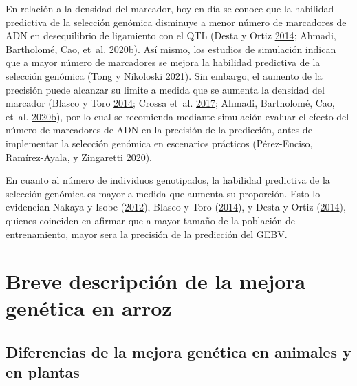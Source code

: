 \documentclass[11pt,spanish,a4paper,oneside,]{book} %
\begin{document}
En relación a la densidad del marcador, hoy en día se conoce que la habilidad predictiva de la selección genómica disminuye a menor número de marcadores de ADN en desequilibrio de ligamiento con el QTL (Desta y Ortiz \protect\hyperlink{ref-cite:10}{2014}; Ahmadi, Bartholomé, Cao, et~al. \protect\hyperlink{ref-cite:45}{2020}\protect\hyperlink{ref-cite:45}{b}). Así mismo, los estudios de simulación indican que a mayor número de marcadores se mejora la habilidad predictiva de la selección genómica (Tong y Nikoloski \protect\hyperlink{ref-cite:7}{2021}). Sin embargo, el aumento de la precisión puede alcanzar su limite a medida que se aumenta la densidad del marcador (Blasco y Toro \protect\hyperlink{ref-cite:3}{2014}; Crossa et~al. \protect\hyperlink{ref-cite:37}{2017}; Ahmadi, Bartholomé, Cao, et~al. \protect\hyperlink{ref-cite:45}{2020}\protect\hyperlink{ref-cite:45}{b}), por lo cual se recomienda mediante simulación evaluar el efecto del número de marcadores de ADN en la precisión de la predicción, antes de implementar la selección genómica en escenarios prácticos (Pérez-Enciso, Ramírez-Ayala, y Zingaretti \protect\hyperlink{ref-cite:47}{2020}).

En cuanto al número de individuos genotipados, la habilidad predictiva de la selección genómica es mayor a medida que aumenta su proporción. Esto lo evidencian Nakaya y Isobe (\protect\hyperlink{ref-cite:6}{2012}), Blasco y Toro (\protect\hyperlink{ref-cite:3}{2014}), y Desta y Ortiz (\protect\hyperlink{ref-cite:10}{2014}), quienes coinciden en afirmar que a mayor tamaño de la población de entrenamiento, mayor sera la precisión de la predicción del GEBV.

\hypertarget{breve-descripciuxf3n-de-la-mejora-genuxe9tica-en-arroz}{%
\section{Breve descripción de la mejora genética en arroz}\label{breve-descripciuxf3n-de-la-mejora-genuxe9tica-en-arroz}}

\hypertarget{diferencias-de-la-mejora-genuxe9tica-en-animales-y-en-plantas}{%
\subsection{Diferencias de la mejora genética en animales y en plantas}\label{diferencias-de-la-mejora-genuxe9tica-en-animales-y-en-plantas}}
\end{document}
